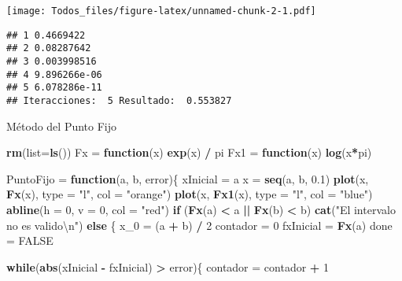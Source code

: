 \documentclass[]{article}
\newenvironment{Shaded}{\begin{snugshade}}{\end{snugshade}}
\newcommand{\CharTok}[1]{\textcolor[rgb]{0.31,0.60,0.02}{#1}}
\newcommand{\ControlFlowTok}[1]{\textcolor[rgb]{0.13,0.29,0.53}{\textbf{#1}}}
\newcommand{\DataTypeTok}[1]{\textcolor[rgb]{0.13,0.29,0.53}{#1}}
\newcommand{\DecValTok}[1]{\textcolor[rgb]{0.00,0.00,0.81}{#1}}
\newcommand{\FloatTok}[1]{\textcolor[rgb]{0.00,0.00,0.81}{#1}}
\newcommand{\KeywordTok}[1]{\textcolor[rgb]{0.13,0.29,0.53}{\textbf{#1}}}
\newcommand{\NormalTok}[1]{#1}
\newcommand{\OperatorTok}[1]{\textcolor[rgb]{0.81,0.36,0.00}{\textbf{#1}}}
\newcommand{\OtherTok}[1]{\textcolor[rgb]{0.56,0.35,0.01}{#1}}
\newcommand{\StringTok}[1]{\textcolor[rgb]{0.31,0.60,0.02}{#1}}
\begin{document}
\texttt{[image: Todos\_files/figure-latex/unnamed-chunk-2-1.pdf]}

\begin{verbatim}
## 1 0.4669422 
## 2 0.08287642 
## 3 0.003998516 
## 4 9.896266e-06 
## 5 6.078286e-11 
## Iteracciones:  5 Resultado:  0.553827
\end{verbatim}

Método del Punto Fijo

\begin{Shaded}
\begin{Highlighting}[]
\KeywordTok{rm}\NormalTok{(}\DataTypeTok{list=}\KeywordTok{ls}\NormalTok{())}
\NormalTok{Fx =}\StringTok{ }\ControlFlowTok{function}\NormalTok{(x) }\KeywordTok{exp}\NormalTok{(x) }\OperatorTok{/}\StringTok{ }\NormalTok{pi}
\NormalTok{Fx1 =}\StringTok{ }\ControlFlowTok{function}\NormalTok{(x) }\KeywordTok{log}\NormalTok{(x}\OperatorTok{*}\NormalTok{pi)}

\NormalTok{PuntoFijo =}\StringTok{ }\ControlFlowTok{function}\NormalTok{(a, b, error)\{}
\NormalTok{  xInicial =}\StringTok{ }\NormalTok{a}
\NormalTok{  x =}\StringTok{ }\KeywordTok{seq}\NormalTok{(a, b, }\FloatTok{0.1}\NormalTok{)}
  \KeywordTok{plot}\NormalTok{(x, }\KeywordTok{Fx}\NormalTok{(x), }\DataTypeTok{type =} \StringTok{"l"}\NormalTok{, }\DataTypeTok{col =} \StringTok{"orange"}\NormalTok{)}
  \KeywordTok{plot}\NormalTok{(x, }\KeywordTok{Fx1}\NormalTok{(x), }\DataTypeTok{type =} \StringTok{"l"}\NormalTok{, }\DataTypeTok{col =} \StringTok{"blue"}\NormalTok{)}
  \KeywordTok{abline}\NormalTok{(}\DataTypeTok{h =} \DecValTok{0}\NormalTok{, }\DataTypeTok{v =} \DecValTok{0}\NormalTok{, }\DataTypeTok{col =} \StringTok{"red"}\NormalTok{)}
  \ControlFlowTok{if}\NormalTok{ (}\KeywordTok{Fx}\NormalTok{(a) }\OperatorTok{<}\StringTok{ }\NormalTok{a }\OperatorTok{||}\StringTok{ }\KeywordTok{Fx}\NormalTok{(b) }\OperatorTok{<}\StringTok{ }\NormalTok{b)}
    \KeywordTok{cat}\NormalTok{(}\StringTok{"El intervalo no es valido}\CharTok{\textbackslash{}n}\StringTok{"}\NormalTok{)}
  \ControlFlowTok{else}\NormalTok{ \{}
\NormalTok{    x_}\DecValTok{0}\NormalTok{ =}\StringTok{ }\NormalTok{(a }\OperatorTok{+}\StringTok{ }\NormalTok{b) }\OperatorTok{/}\StringTok{ }\DecValTok{2}
\NormalTok{    contador =}\StringTok{ }\DecValTok{0}
\NormalTok{    fxInicial =}\StringTok{ }\KeywordTok{Fx}\NormalTok{(a)}
\NormalTok{    done =}\StringTok{ }\OtherTok{FALSE}
    
    \ControlFlowTok{while}\NormalTok{(}\KeywordTok{abs}\NormalTok{(xInicial }\OperatorTok{-}\StringTok{ }\NormalTok{fxInicial) }\OperatorTok{>}\StringTok{ }\NormalTok{error)\{}
\NormalTok{      contador =}\StringTok{ }\NormalTok{contador }\OperatorTok{+}\StringTok{ }\DecValTok{1}
      

\end{Highlighting}
\end{Shaded}
\end{document}
